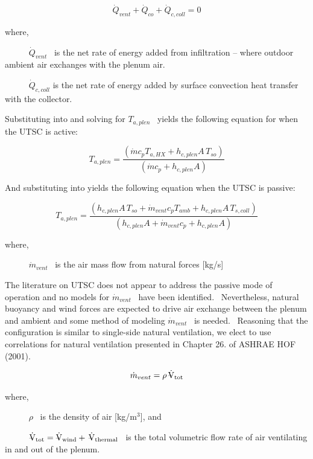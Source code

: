 \begin{equation}
{\dot Q_{vent}} + {\dot Q_{co}} + {\dot Q_{c,coll}} = 0
\end{equation}

where,

~~~~~ \({\dot Q_{vent}}\) ~is the net rate of energy added from infiltration -- where outdoor ambient air exchanges with the plenum air.

~~~~~ \({\dot Q_{c,coll}}\) is the net rate of energy added by surface convection heat transfer with the collector.

Substituting into and solving for \({T_{a,plen}}\) ~yields the following equation for when the UTSC is active:

\begin{equation}
{T_{a,plen}} = \frac{{\left( {\dot m{c_p}{T_{a,HX}} + {h_{c,plen}}A\,{T_{so}}} \right)}}{{\left( {\dot m{c_p} + {h_{c,plen}}A} \right)}}
\end{equation}

And substituting into yields the following equation when the UTSC is passive:

\begin{equation}
{T_{a,plen}} = \frac{{\left( {{h_{c,plen}}A\,{T_{so}} + {{\dot m}_{vent}}{c_p}{T_{amb}} + {h_{c,plen}}A\,{T_{s,coll}}} \right)}}{{\left( {{h_{c,plen}}A + {{\dot m}_{vent}}{c_p} + {h_{c,plen}}A} \right)}}
\end{equation}

where,

~~~~~ \({\dot m_{vent}}\) ~is the air mass flow from natural forces {[}kg/s{]}

The literature on UTSC does not appear to address the passive mode of operation and no models for \({\dot m_{vent}}\) ~have been identified.~ Nevertheless, natural buoyancy and wind forces are expected to drive air exchange between the plenum and ambient and some method of modeling \({\dot m_{vent}}\) ~is needed.~ Reasoning that the configuration is similar to single-side natural ventilation, we elect to use correlations for natural ventilation presented in Chapter 26. of ASHRAE HOF (2001).

\begin{equation}
{\dot m_{vent}} = \rho \,{{\rm{\rlap{--} \dot V}}_{{\rm{tot}}}}
\end{equation}

where,

~~~~~ \(\rho\) ~is the density of air {[}kg/m\(^{3}\){]}, and

~~~~~ \({{\rm{\rlap{--} \dot V}}_{{\rm{tot}}}} = {{\rm{\rlap{--} \dot V}}_{{\rm{wind}}}} + \,{{\rm{\rlap{--} \dot V}}_{{\rm{thermal}}}}\) ~is the total volumetric flow rate of air ventilating in and out of the plenum.

